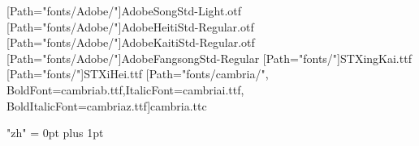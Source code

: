 [Path="fonts/Adobe/"]{AdobeSongStd-Light.otf}
[Path="fonts/Adobe/"]{AdobeHeitiStd-Regular.otf}
[Path="fonts/Adobe/"]{AdobeKaitiStd-Regular.otf}
[Path="fonts/Adobe/"]{AdobeFangsongStd-Regular}
[Path="fonts/"]{STXingKai.ttf}
[Path="fonts/"]{STXiHei.ttf}
[Path="fonts/cambria/", BoldFont={cambriab.ttf},ItalicFont={cambriai.ttf}, BoldItalicFont={cambriaz.ttf}]{cambria.ttc}


\XeTeXlinebreaklocale "zh"      %
\XeTeXlinebreakskip = 0pt plus 1pt %
